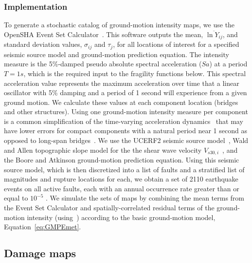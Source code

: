 \subsubsection{Implementation}
To generate a stochastic catalog of ground-motion intensity maps, we use the OpenSHA Event Set Calculator~\cite{field_opensha:_2003}. This software outputs the mean, $\overline{\ln Y_{ij}}$, and standard deviation values, $\sigma_{ij}$ and $\tau_j$, for all locations of interest for a specified seismic source model and ground-motion prediction equation. The intensity measure is the 5\%-damped pseudo absolute  spectral acceleration ($Sa$) at a period $T=1s$, which is the required input to the fragility functions below. This spectral acceleration value represents the maximum acceleration over time  that a linear oscillator with 5\% damping and a period of 1 second will experience from a given ground motion. We calculate these values at each component location (bridges and other structures). Using one ground-motion intensity measure per component is a common simplification of the time-varying acceleration dynamics~\cite[e.g.,][]{shinozuka_effect_2003,jayaram_efficient_2010} that may have lower errors for compact components with a natural period near 1 second as opposed to long-span bridges~\cite{konakli_simulation_2012}.
We use the UCERF2 seismic source model~\cite{field_uniform_2009}, Wald and Allen topographic slope model for the the shear wave velocity $V_{s30,i}$~\cite{wald_topographic_2007}, and the Boore and Atkinson \cite{boore_ground-motion_2008} ground-motion prediction equation.   Using this seismic source model, which is then discretized into a list of faults and a stratified list of magnitudes and rupture locations for each, we obtain a set of 2110 earthquake events on all active faults, each with an annual occurrence rate greater than or equal to $10^{-5}$ . We simulate the sets of maps by combining the mean terms from the Event Set Calculator and spatially-correlated residual terms of the ground-motion intensity  (using~\cite{jayaram_correlation_2009}) according to the basic ground-motion model, Equation~\ref{eq:GMPEmet}. 


\subsection{Damage maps}
